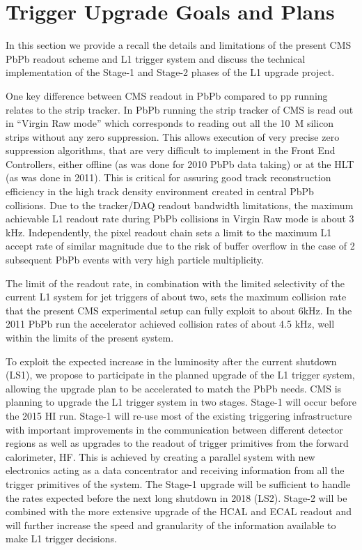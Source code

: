\newpage

\section{Trigger Upgrade Goals and Plans\label{sec:calo}}

In this section we provide a recall the details and limitations of the present CMS PbPb readout scheme and L1 trigger system 
and discuss the technical implementation of the Stage-1 and Stage-2 phases of the L1 upgrade project. 

One key difference between CMS readout in PbPb compared to pp running relates to the strip tracker.
In PbPb running the strip tracker of CMS is read out in ``Virgin Raw mode'' which corresponds to 
reading out all the 10~M silicon strips without any zero suppression. This allows execution of very precise zero 
suppression algorithms, that are very difficult to implement in the Front End Controllers, either offline (as was done for 2010 PbPb
data taking) or at the HLT (as was done in 2011). This is critical for assuring good track reconstruction efficiency 
in the high track density environment created in central PbPb collisions.  
Due to the tracker/DAQ readout bandwidth limitations, the maximum achievable L1 readout rate during PbPb collisions 
in Virgin Raw mode is about 3 kHz. Independently, the pixel readout chain sets a limit to the maximum L1 accept 
rate of similar magnitude due to the risk of buffer overflow in the case of 2 subsequent PbPb events with very 
high particle multiplicity. 

The limit of the readout rate, in combination with the limited selectivity of the current L1 system for jet triggers 
of about two, sets the maximum collision rate that the present CMS experimental setup can fully exploit to about 6kHz.
In the 2011 PbPb run the accelerator achieved collision rates of about 4.5 kHz, well within the limits of the present system.

To exploit the expected increase in the luminosity after the current shutdown (LS1), we propose to participate in 
the planned upgrade of the L1 trigger system, allowing the upgrade plan to be accelerated to match the PbPb needs. 
CMS is planning to upgrade the L1 trigger system in two stages. Stage-1 will occur before the 2015 HI run.  Stage-1
will re-use most of the existing triggering infrastructure with important improvements in the communication 
between different detector regions as well as upgrades to the readout of trigger primitives from the forward 
calorimeter, HF. This is achieved by creating a parallel system with new electronics acting as a data concentrator 
and receiving information from all the trigger primitives of the system. 
The Stage-1 upgrade will be sufficient to handle the rates expected before the next long shutdown in 2018 (LS2). 
Stage-2 will be combined with the more extensive upgrade of the HCAL and ECAL readout and will further increase 
the speed and granularity of the information available to make L1 trigger decisions. 


